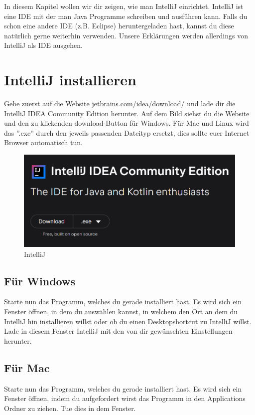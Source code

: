 
\label{ex2}

In diesem Kapitel wollen wir dir zeigen, wie man IntelliJ einrichtet. 
IntelliJ ist eine IDE mit der man Java Programme schreiben und ausführen kann. 
Falls du schon eine andere IDE (z.B. Eclipse) heruntergeladen hast, kannst du diese natürlich gerne weiterhin verwenden. 
Unsere Erklärungen werden allerdings von IntelliJ als IDE ausgehen.

\section*{IntelliJ installieren}
Gehe zuerst auf die Website \href{\intellijurl}{jetbrains.com/idea/download/} und lade dir die IntelliJ IDEA Community Edition herunter. 
Auf dem Bild siehst du die Website und den zu klickenden download-Button für Windows. 
Für Mac und Linux wird das ''.exe'' durch den jeweils passenden Dateityp ersetzt, dies sollte euer Internet Browser automatisch tun.
\begin{figure}[h]
\begin{center}
    \includegraphics[width=\linewidth]{./figures/IntelliJ download site.PNG}
\end{center}
\caption{IntelliJ}
\label{fig:Picture1i:IntelliJ}
\end{figure}
\subsection*{Für Windows}
Starte nun das Programm, welches du gerade installiert hast. 
Es wird sich ein Fenster öffnen, in dem  du auswählen kannst, in welchem den Ort an dem du IntelliJ hin installieren willst oder 
ob du einen Desktopshortcut zu IntelliJ willst. 
Lade in diesem Fenster IntelliJ mit den von dir gewünschten Einstellungen herunter.
\subsection*{Für Mac}
Starte nun das Programm, welches du gerade installiert hast. 
Es wird sich ein Fenster öffnen, indem du aufgefordert wirst das Programm in den Applications Ordner zu ziehen. 
Tue dies in dem Fenster.


